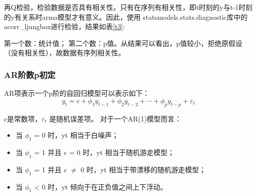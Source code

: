 \documentclass[a4paper,AutoFakeBold,AutoFakeSlant]{ctexart}
\begin{document}
再Q检验，检验数据是否具有相关性。只有在序列有相关性，即t时刻的y与t-1时刻的y有关系时arma模型才有意义。因此，使用
statsmodels.stats.diagnostic库中的acorr\_ljungbox进行检验，结果如表\ref{t3}:

第一个数：统计值； 第二个数：p值。从结果可以看出，p值较小，拒绝原假设（没有相关性），故数据有序列相关性。
\begin{table}[H]
  \begin{center}
\end{center}
\end{table}



\subsubsection{AR阶数p初定}

AR项表示一个p阶的自回归模型可以表示如下：
\begin{equation}
  y_t = c + \phi_1 y_{t-1} + \phi_2 y_{t-2} + \cdots + \phi_p y_{t-p} + \varepsilon_t
\end{equation}

c是常数项，$\varepsilon_t$ 是随机误差项。
对于一个AR(1)模型而言：
\begin{itemize}
  \item 当 $\phi_1$ = 0 时，yt 相当于白噪声；
  \item 当 $\phi_1$ = 1 并且 c = 0 时，yt 相当于随机游走模型；
  \item 当 $\phi_1$ = 1 并且 c $\neq$ 0 时，yt 相当于带漂移的随机游走模型；
  \item 当 $\phi_1$ < 0 时，yt 倾向于在正负值之间上下浮动。
\end{itemize}
\end{document}
